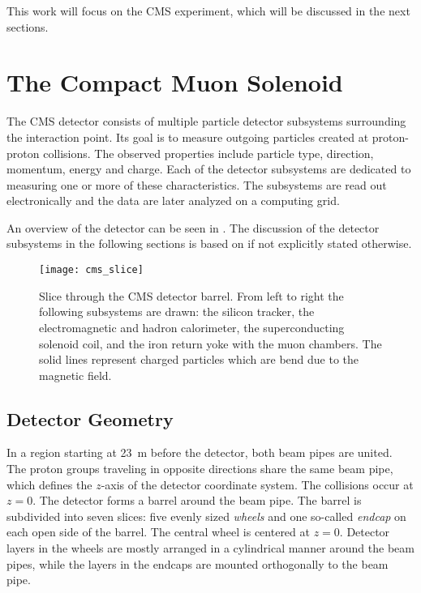 This work will focus on the \ac{CMS} experiment, which will be discussed in the next sections.

\section{The Compact Muon Solenoid}
The \ac{CMS} detector consists of multiple particle detector subsystems surrounding the interaction point.
Its goal is to measure outgoing particles created at proton-proton collisions.
The observed properties include particle type, direction, momentum, energy and charge. Each of the detector subsystems are dedicated to measuring one or more of these characteristics. The subsystems are read out electronically and the data are later analyzed on a computing grid.

An overview of the detector can be seen in . The discussion of the detector subsystems in the following sections is based on \cite{Chatrchyan:CMSexperimentCERN} if not explicitly stated otherwise.

\begin{figure}
    \centering
    \hspace{0.02\textwidth}
    \texttt{[image: cms\_slice]}
    \caption{Slice through the CMS detector barrel. From left to right the following subsystems are drawn: the silicon tracker, the electromagnetic and hadron calorimeter, the superconducting solenoid coil, and the iron return yoke with the muon chambers. The solid lines represent charged particles which are bend due to the magnetic field\cite[modified]{Davis:CMSSlice}.}
    \label{fig:CMS_slice}
\end{figure}

\subsection{Detector Geometry}
In a region starting at \SI{23}{\m} before the detector, both beam pipes are united\cite{Evans:LHCMachine}. The proton groups traveling in opposite directions share the same beam pipe, which defines the $z$-axis of the detector coordinate system. The collisions occur at $z = 0$.
The detector forms a barrel around the beam pipe. The barrel is subdivided into seven slices: five evenly sized \emph{wheels} and one so-called \emph{endcap} on each open side of the barrel. The central wheel is centered at $z = 0$.
Detector layers in the wheels are mostly arranged in a cylindrical manner around the beam pipes, while the layers in the endcaps are mounted orthogonally to the beam pipe.

